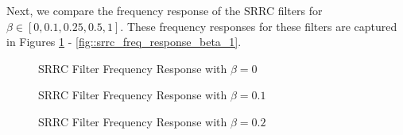 \documentclass{article}
\begin{document}
Next, we compare the frequency response of the SRRC filters for $\beta \in [0,0.1,0.25,0.5,1]$. These frequency responses for these filters are captured in Figures \ref{fig::srrc_freq_response_beta_0} - \ref{fig::srrc_freq_response_beta_1}.

\begin{figure}[H]
	\centerline{}
	\caption{SRRC Filter Frequency Response with $\beta=0$}
	\label{fig::srrc_freq_response_beta_0}
\end{figure}

\begin{figure}[H]
	\centerline{}
	\caption{SRRC Filter Frequency Response with $\beta=0.1$}
	\label{fig::srrc_freq_response_beta_0_1}
\end{figure}

\begin{figure}[H]
	\centerline{}
	\caption{SRRC Filter Frequency Response with $\beta=0.2$}
	\label{fig::srrc_freq_response_beta_0_2}
\end{figure}
\end{document}
